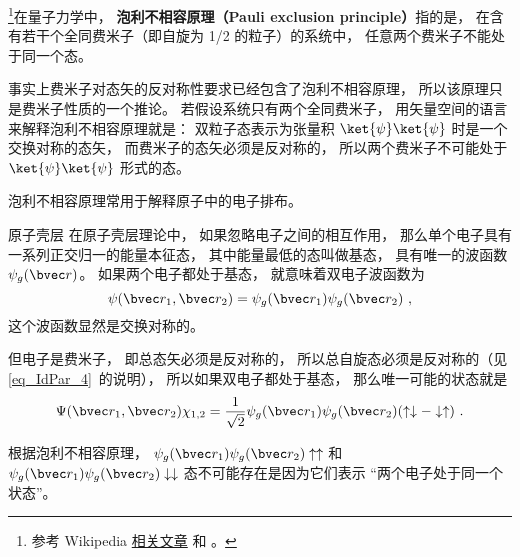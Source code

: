 
\begin{issues}
\issueDraft
\end{issues}

\footnote{参考 Wikipedia \href{https://en.wikipedia.org/wiki/Pauli_exclusion_principle}{相关文章} 和 \cite{GriffQ}。}在量子力学中， \textbf{泡利不相容原理（Pauli exclusion principle）}指的是， 在含有若干个全同费米子（即自旋为 1/2 的粒子）的系统中， 任意两个费米子不能处于同一个态。

事实上费米子对态矢的反对称性要求已经包含了泡利不相容原理， 所以该原理只是费米子性质的一个推论。 若假设系统只有两个全同费米子， 用矢量空间的语言来解释泡利不相容原理就是： 双粒子态表示为张量积 $\ket{\psi}\ket{\psi}$ 时是一个交换对称的态矢， 而费米子的态矢必须是反对称的， 所以两个费米子不可能处于 $\ket{\psi}\ket{\psi}$ 形式的态。

泡利不相容原理常用于解释原子中的电子排布。

\begin{example}{原子壳层}
在原子壳层理论中， 如果忽略电子之间的相互作用， 那么单个电子具有一系列正交归一的能量本征态， 其中能量最低的态叫做基态， 具有唯一的波函数 $\psi_g(\bvec r)$。 如果两个电子都处于基态， 就意味着双电子波函数为
\begin{equation}
\psi(\bvec r_1, \bvec r_2) = \psi_g(\bvec r_1)\psi_g(\bvec r_2)~,
\end{equation}
这个波函数显然是交换对称的。

但电子是费米子， 即总态矢必须是反对称的， 所以总自旋态必须是反对称的（见\autoref{eq_IdPar_4}~的说明）， 所以如果双电子都处于基态， 那么唯一可能的状态就是
\begin{equation}
\Psi(\bvec r_1, \bvec r_2) \chi_{1,2} = \frac{1}{\sqrt{2}}\psi_g(\bvec r_1)\psi_g(\bvec r_2)(\uparrow\downarrow - \downarrow\uparrow)~.
\end{equation}

根据泡利不相容原理， $\psi_g(\bvec r_1)\psi_g(\bvec r_2)\uparrow\uparrow$ 和 $\psi_g(\bvec r_1)\psi_g(\bvec r_2)\downarrow\downarrow$ 态不可能存在是因为它们表示 “两个电子处于同一个状态”。
\end{example}
